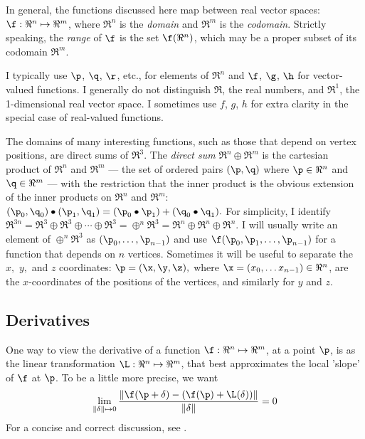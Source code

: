 In general, the functions discussed here map between real vector spaces:
$\f:{\Re}^{n} \mapsto \Re^{m}$, where $\Re^n$ is the
{\it domain} and $\Re^m$ is the {\it codomain}.
Strictly speaking, the {\it range} of $\f$ is the set $\f(\Re^n)$,
which may be a proper subset of its codomain $\Re^m$.

I typically use $\p$, $\q$, $\r$, etc., for elements of $\Re^n$
and
$\f$, $\g$, $\h$ for vector-valued functions.
I generally do not distinguish $\Re$, the real numbers,
and $\Re^1$, the 1-dimensional real vector space.
I sometimes use $f$, $g$, $h$ for extra clarity in the special
case of real-valued functions.

The domains of many interesting functions,
such as those that depend on vertex positions,
are direct sums of $\Re^3$.
The {\it direct sum} $\Re^n \oplus \Re^m$ is the cartesian product
of $\Re^n$ and $\Re^m$ --- the set of ordered pairs $(\p,\q)$
where $\p \in \Re^n$ and $\q \in \Re^m$ ---
with the restriction that the inner product is the obvious extension of the
inner products on $\Re^n$ and $\Re^m$:
$(\p_0,\q_0) \bullet (\p_1,\q_1) = (\p_0 \bullet \p_1) + (\q_0 \bullet \q_1).$
For simplicity, I identify
$\Re^{3n} = \Re^3 \oplus \Re^3 \oplus \cdots \oplus \Re^3 = \oplus^n \Re^3
= \Re^n \oplus \Re^n \oplus \Re^n $.
I will usually write an element of $\oplus^n \Re^3$ as
$(\p_0,\ldots,\p_{n-1})$
and use
$\f(\p_0,\p_1,\ldots,\p_{n-1})$
for a function that depends on $n$ vertices.
Sometimes it will be useful to separate the $x,$ $y,$ and $z$ coordinates:
$\p = (\x,\y,\z),$
where $\x =(x_0, \ldots x_{n-1}) \in \Re^n$, are the $x$-coordinates
of the positions of the vertices, and similarly for $y$ and $z$.


\subsection{Derivatives}
\label{sec:derivatives}

One way to view the derivative of a function
$\f:{\Re}^{n} \mapsto \Re^{m}$,
at a point $\p$,
is as the linear transformation $\L:{\Re}^{n} \mapsto \Re^{m}$,
that best approximates the local 'slope' of $\f$ at $\p$.
To be a little more precise, we want
\begin{displaymath}
\lim_{ \|{\bf \delta}  \| \mapsto 0}
{ \|{\f(\p + {\bf \delta}) - (\f(\p) + \L({\bf\delta})) \|}
  \over  \|{\bf \delta}  \|}
 = 0
\end{displaymath}
For a concise and correct discussion, see \cite{spivak-1965}.

